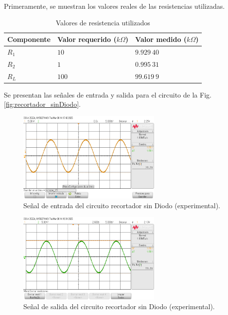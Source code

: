 \documentclass[journal]{IEEEtran}
\begin{document}
Primeramente, se muestran los valores reales de las resistencias utilizadas. 

\begin{table}[H]
        \centering
        \renewcommand{\arraystretch}{1.5}
        \caption{Valores de resistencia utilizados}
        \begin{tabular}{ m{2cm} m{2cm} m{2cm} }
            \hline
            Componente & Valor requerido ($k\Omega$) & Valor medido ($k\Omega$) \\ 
            \hline
            $R_1$ & $10$ & $9.929~40$ \\ 
            $R_2$ & $1$ & $0.995~31$ \\
            $R_L$ & $100$ & $99.619~9$ \\
            \hline
        \end{tabular}
        \label{tabla1}
    \end{table}
    

Se presentan las señales de entrada y salida para el circuito de la Fig. \ref{fig:recortador_sinDiodo}.
\begin{figure}[H]
        \centering
        \includegraphics[width=2.8in]{SignalExperimental_01.png}
        \caption{Señal de entrada del circuito recortador sin Diodo (experimental).}
        \label{fig:SignalExperimental_01}
\end{figure}
\begin{figure}[H]
        \centering
        \includegraphics[width=2.8in]{SignalExperimental_02.png}
        \caption{Señal de salida del circuito recortador sin Diodo (experimental).}
        \label{fig:SignalExperimental_02}
\end{figure}
\end{document}

